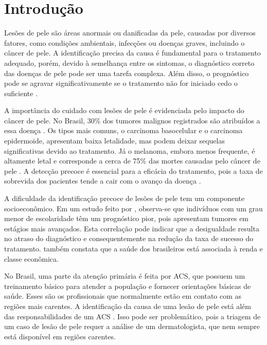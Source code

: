 \chapter{Introdução}

Lesões de pele são áreas anormais ou danificadas da pele, causadas por diversos fatores, como condições ambientais,
infecções ou doenças graves, incluindo o câncer de pele. A identificação precisa da causa é fundamental para o
tratamento adequado, porém, devido à semelhança entre os sintomas, o diagnóstico correto das doenças de pele pode ser
uma tarefa complexa. Além disso, o prognóstico pode se agravar significativamente se o tratamento não for iniciado
cedo o suficiente \cite{habif2015clinical}.

A importância do cuidado com lesões de pele é evidenciada pelo impacto do câncer de pele. No Brasil, 30\% dos tumores
malignos registrados são atribuídos a essa doença \cite{skin_cancer_in_brazil}. Os tipos mais comuns, o carcinoma
basocelular e o carcinoma epidermoide, apresentam baixa letalidade, mas podem deixar sequelas significativas devido ao
tratamento. Já o melanoma, embora menos frequente, é altamente letal e corresponde a cerca de 75\% das mortes causadas
pelo câncer de pele \cite{skin_cancer_screening}. A detecção precoce é essencial para a eficácia do tratamento, pois a
taxa de sobrevida dos pacientes tende a cair com o avanço da doença \cite{skin_cancer_survival}.

A dificuldade da identificação precoce de lesões de pele tem um componente socioeconômico. Em um estudo feito por
\textcite{skin_cancer_socioeconomic}, observa-se que indivíduos com um grau menor de escolaridade têm um prognóstico
pior, pois apresentam tumores em estágios mais avançados. Esta correlação pode indicar que a desigualdade resulta no
atraso do diagnóstico e consequentemente na redução da taxa de sucesso do tratamento.
\textcite{santos2020desigualdades} também constata que a saúde dos brasileiros está associada à renda e classe
econômica.

No Brasil, uma parte da atenção primária é feita por \ac{ACS}, que possuem um treinamento básico para atender a
população e fornecer orientações básicas de saúde. Esses são os profissionais que normalmente estão em contato com as
regiões mais carentes. A identificação da causa de uma lesão de pele está além das responsabilidades de um \ac{ACS}
\cite{filgueiras2011agente}. Isso pode ser problemático, pois a triagem de um caso de lesão de pele requer a análise de
um dermatologista, que nem sempre está disponível em regiões carentes.

